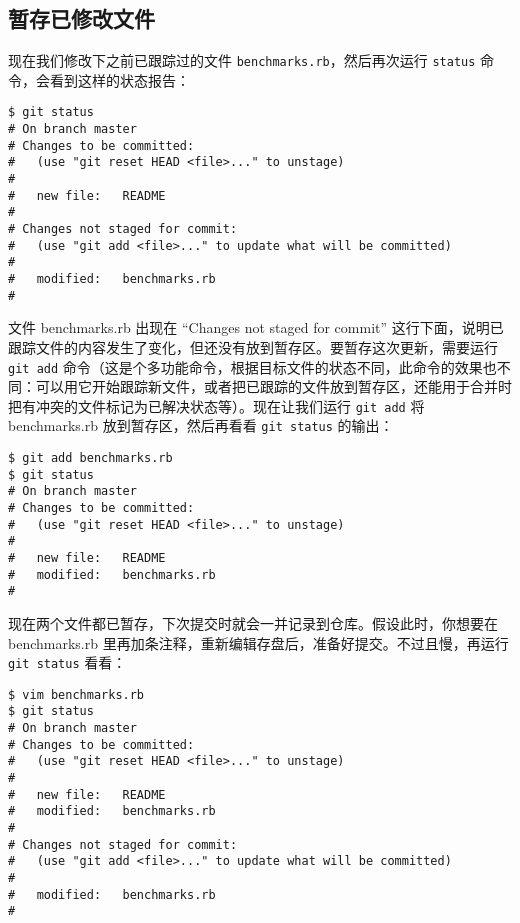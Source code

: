 \documentclass[a4paper]{book}
\begin{document}
\subsection{暂存已修改文件}

现在我们修改下之前已跟踪过的文件 \texttt{benchmarks.rb}，然后再次运行 \texttt{status} 命令，会看到这样的状态报告：

\begin{shaded}\begin{verbatim}
$ git status
# On branch master
# Changes to be committed:
#   (use "git reset HEAD <file>..." to unstage)
#
#	new file:   README
#
# Changes not staged for commit:
#   (use "git add <file>..." to update what will be committed)
#
#	modified:   benchmarks.rb
#
\end{verbatim}\end{shaded}

文件 benchmarks.rb 出现在 “Changes not staged for commit” 这行下面，说明已跟踪文件的内容发生了变化，但还没有放到暂存区。要暂存这次更新，需要运行 \texttt{git add} 命令（这是个多功能命令，根据目标文件的状态不同，此命令的效果也不同：可以用它开始跟踪新文件，或者把已跟踪的文件放到暂存区，还能用于合并时把有冲突的文件标记为已解决状态等）。现在让我们运行 \texttt{git add} 将 benchmarks.rb 放到暂存区，然后再看看 \texttt{git status} 的输出：

\begin{shaded}\begin{verbatim}
$ git add benchmarks.rb
$ git status
# On branch master
# Changes to be committed:
#   (use "git reset HEAD <file>..." to unstage)
#
#	new file:   README
#	modified:   benchmarks.rb
#
\end{verbatim}\end{shaded}

现在两个文件都已暂存，下次提交时就会一并记录到仓库。假设此时，你想要在 benchmarks.rb 里再加条注释，重新编辑存盘后，准备好提交。不过且慢，再运行 \texttt{git status} 看看：

\begin{shaded}\begin{verbatim}
$ vim benchmarks.rb 
$ git status
# On branch master
# Changes to be committed:
#   (use "git reset HEAD <file>..." to unstage)
#
#	new file:   README
#	modified:   benchmarks.rb
#
# Changes not staged for commit:
#   (use "git add <file>..." to update what will be committed)
#
#	modified:   benchmarks.rb
#
\end{verbatim}\end{shaded}
\end{document}
